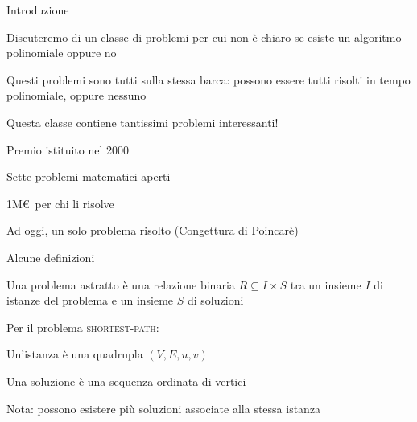 \begin{frame}{Introduzione}

\vspace{-9pt}
\begin{myboxtitle}
\BIL
\item Discuteremo di un classe di problemi per cui non è chiaro se esiste
un algoritmo polinomiale oppure no
\item Questi problemi sono tutti sulla stessa barca: 
  possono essere tutti risolti in tempo polinomiale, oppure nessuno
\item Questa classe contiene tantissimi problemi interessanti!
\EIL
\end{myboxtitle}

\begin{myboxtitle}
\BI
\item Premio istituito nel 2000
\item Sette problemi matematici aperti
\item 1M\euro\ per chi li risolve
\item Ad oggi, un solo problema risolto (Congettura di Poincarè)
\EI
\end{myboxtitle}

\end{frame}


\begin{frame}{Alcune definizioni}

\vspace{-9pt}
\begin{myboxtitle}
Una \alert{problema astratto} è una relazione binaria $R \subseteq I \times S$
tra un insieme $I$ di istanze del problema e un insieme $S$ di
soluzioni
\end{myboxtitle}

\begin{myboxtitle}[Esempio]
Per il problema \textsc{shortest-path}:
\BIL
\item Un'istanza è una quadrupla $(V,E,u,v)$
\item Una soluzione è una sequenza ordinata di vertici
\item Nota: possono esistere più soluzioni associate alla stessa istanza
\EIL
\end{myboxtitle}

\end{frame}


